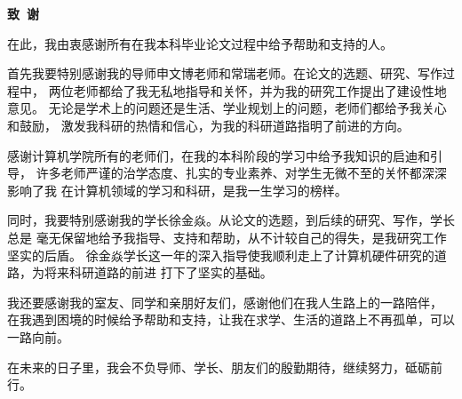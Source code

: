 \cleardoublepage{}
\begin{center}
    \bfseries {} 致~谢
\end{center}

在此，我由衷感谢所有在我本科毕业论文过程中给予帮助和支持的人。\par

首先我要特别感谢我的导师申文博老师和常瑞老师。在论文的选题、研究、写作过程中，
两位老师都给了我无私地指导和关怀，并为我的研究工作提出了建设性地意见。
无论是学术上的问题还是生活、学业规划上的问题，老师们都给予我关心和鼓励，
激发我科研的热情和信心，为我的科研道路指明了前进的方向。\par

感谢计算机学院所有的老师们，在我的本科阶段的学习中给予我知识的启迪和引导，
许多老师严谨的治学态度、扎实的专业素养、对学生无微不至的关怀都深深影响了我
在计算机领域的学习和科研，是我一生学习的榜样。\par

同时，我要特别感谢我的学长徐金焱。从论文的选题，到后续的研究、写作，学长总是
毫无保留地给予我指导、支持和帮助，从不计较自己的得失，是我研究工作坚实的后盾。
徐金焱学长这一年的深入指导使我顺利走上了计算机硬件研究的道路，为将来科研道路的前进
打下了坚实的基础。\par

我还要感谢我的室友、同学和亲朋好友们，感谢他们在我人生路上的一路陪伴，
在我遇到困境的时候给予帮助和支持，让我在求学、生活的道路上不再孤单，可以一路向前。\par

在未来的日子里，我会不负导师、学长、朋友们的殷勤期待，继续努力，砥砺前行。\par